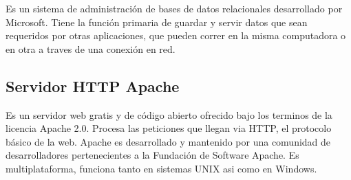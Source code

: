 Es un sistema de administración de bases de datos relacionales desarrollado por Microsoft. Tiene la función primaria de guardar y servir datos  que sean requeridos por otras aplicaciones, que pueden correr en la misma computadora o en otra a traves de una conexión en red.

\subsection{Servidor HTTP Apache}

Es un servidor web gratis y de código abierto ofrecido bajo los terminos de la licencia Apache 2.0. Procesa las peticiones que llegan via HTTP, el protocolo básico de la web. Apache es desarrollado y mantenido  por una comunidad de desarrolladores pertenecientes a la Fundación de Software Apache. Es multiplataforma, funciona tanto en sistemas UNIX asi como en Windows.


